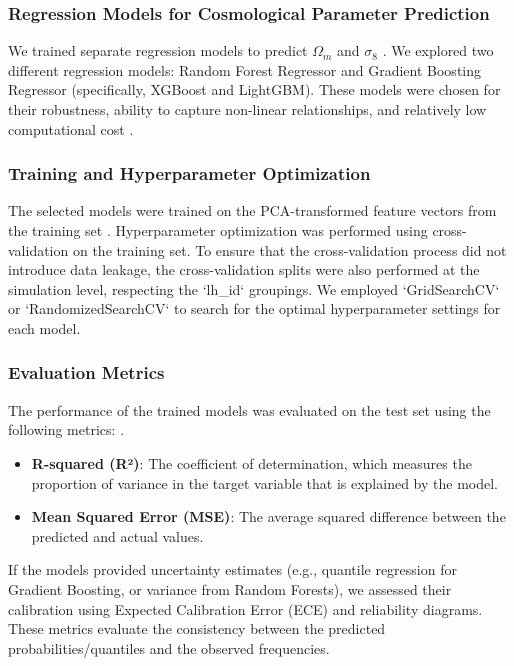 \documentclass[twocolumn]{aastex631}
\begin{document}
\subsubsection{Regression Models for Cosmological Parameter Prediction}
We trained separate regression models to predict $\Omega_m$ and $\sigma_8$ \citep{villaescusanavarro2021camelsprojectcosmologyastrophysics}. We explored two different regression models: Random Forest Regressor and Gradient Boosting Regressor (specifically, XGBoost and LightGBM). These models were chosen for their robustness, ability to capture non-linear relationships, and relatively low computational cost \citep{villaescusanavarro2021camelsprojectcosmologyastrophysics,balla2024cosmicscalebenchmarksymmetrypreservingdata,makinen2024hybridsummarystatistics}.

\subsubsection{Training and Hyperparameter Optimization}
The selected models were trained on the PCA-transformed feature vectors from the training set \citep{steiner2009pcatomographyextractinformation,yun2023pcafilteringmethodunbiased,kuiper2025representationlearningfastradio}. Hyperparameter optimization was performed using cross-validation on the training set. To ensure that the cross-validation process did not introduce data leakage, the cross-validation splits were also performed at the simulation level, respecting the `lh_id` groupings. We employed `GridSearchCV` or `RandomizedSearchCV` to search for the optimal hyperparameter settings for each model.

\subsubsection{Evaluation Metrics}
The performance of the trained models was evaluated on the test set using the following metrics: \citep{mishrasharma2024paperclipassociatingastronomicalobservations,narkedimilli2024predictingstellarmetallicitycomparative,raghav2024photometricanalysispredictingstar}.
\begin{itemize}
    \item \textbf{R-squared (R²)}: The coefficient of determination, which measures the proportion of variance in the target variable that is explained by the model.
    \item \textbf{Mean Squared Error (MSE)}: The average squared difference between the predicted and actual values.
\end{itemize}
If the models provided uncertainty estimates (e.g., quantile regression for Gradient Boosting, or variance from Random Forests), we assessed their calibration using Expected Calibration Error (ECE) \citep{pandya2025siddasinkhorndynamicdomain} and reliability diagrams. These metrics evaluate the consistency between the predicted probabilities/quantiles and the observed frequencies.
\end{document}
